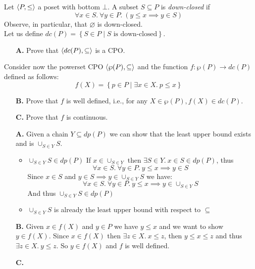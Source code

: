 \begin{exercise}{
    Let $\left< P, \leq \right>$ a poset with bottom $\bot$. A subset $S \subseteq P$ is \textit{down-closed} if
    \[ \forall x \in S.\ \forall y \in P.\ (y \leq x \implies y \in S) \]
    Observe, in particular, that $\varnothing$ is down-closed. \\
    Let us define $dc(P) = \left\{S \in P \mid S \text{ is down-closed}\right\}$.
    \begin{enumerate}
        \item[\textbf{A.}] Prove that $\left< dc(P), \subseteq \right>$ is a CPO.
    \end{enumerate}
    Consider now the powerset CPO $\left< \wp(P), \subseteq \right>$ and the function $f : \wp(P) \to dc(P)$ defined as follows:
    \[ f(X) = \left\{ p \in P \mid \exists x \in X.\ p \leq x \right\} \]
    \begin{enumerate}
        \item[\textbf{B.}] Prove that $f$ is well defined, i.e., for any $X \in \wp(P), f(X) \in dc(P)$.
        \item[\textbf{C.}] Prove that $f$ is continuous.
    \end{enumerate}
}
    \begin{enumerate}
        \item[\textbf{A.}]
            Given a chain $Y \subseteq dp(P)$ we can show that the least upper bound exists and is $\cup_{S \in Y} S$.
            \begin{itemize}
                \item $\cup_{S \in Y} S \in dp(P)$
                    If $x \in \cup_{S \in Y}$ then $\exists S \in Y.\ x \in S \in dp(P)$, thus
                    \[ \forall x \in S.\ \forall y \in P.\ y \leq x \implies y \in S \]
                    Since $x \in S$ and $y \in S \implies y \in \cup_{S \in Y} S$ we have:
                    \[ \forall x \in S.\ \forall y \in P.\ y \leq x \implies y \in \cup_{S \in Y} S \]
                    And thus $\cup_{S \in Y} S \in dp(P)$
                \item $\cup_{S \in Y} S$ is already the least upper bound with respect to $\subseteq$
            \end{itemize}
        \item[\textbf{B.}]
            Given $x \in f(X)$ and $y \in P$ we have $y \leq x$ and we want to show $y \in f(X)$. Since $x \in f(X)$ then $\exists z \in X.\ x \leq z$, then $y \leq x \leq z$ and thus $\exists z \in X.\ y \leq z$. So $y \in f(X)$ and $f$ is well defined.
        \item[\textbf{C.}]

\end{enumerate}
\end{exercise}
